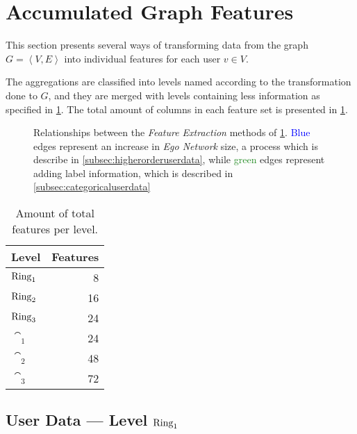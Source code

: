 
\section{Accumulated Graph Features}
\label{sec:accumulatedfeatures}

This section presents several ways of transforming data from the graph $G = \left< V, E \right>$ into individual features for each user $v \in V$.

The aggregations are classified into levels named according to the transformation done to $G$, and they are merged with levels containing less information as specified in \cref{fig:mlrelationships}. The total amount of columns in each feature set is presented in \cref{tab:features}.

\begin{figure}[h]
\centering
\resizebox{!}{.2\textheight}{%
	\framebox{%
		
	}
}
\caption{Relationships between the \emph{Feature Extraction} methods of \cref{sec:accumulatedfeatures}. \textcolor{Blue}{Blue} edges represent an increase in \emph{Ego Network} size, a process which is describe in \cref{subsec:higherorderuserdata}, while \textcolor{ForestGreen}{green} edges represent adding label information, which is described in \cref{subsec:categoricaluserdata}}
\label{fig:mlrelationships}
\end{figure}

\begin{table}[h]
\centering
\begin{tabular}{>{\bfseries}l r}
\toprule
Level & Features \\
\midrule
$\operatorname{Ring}_1$ & \num{8}  \\
$\operatorname{Ring}_2$ & \num{16} \\
$\operatorname{Ring}_3$ & \num{24} \\
$\cat_1$ & \num{24} \\
$\cat_2$ & \num{48} \\
$\cat_3$ & \num{72} \\
\bottomrule
\end{tabular}
\caption{Amount of total features per level.}
\label{tab:features}
\end{table}


\subsection{User Data --- Level $\operatorname{Ring}_1$}
\label{subsec:user_data}

